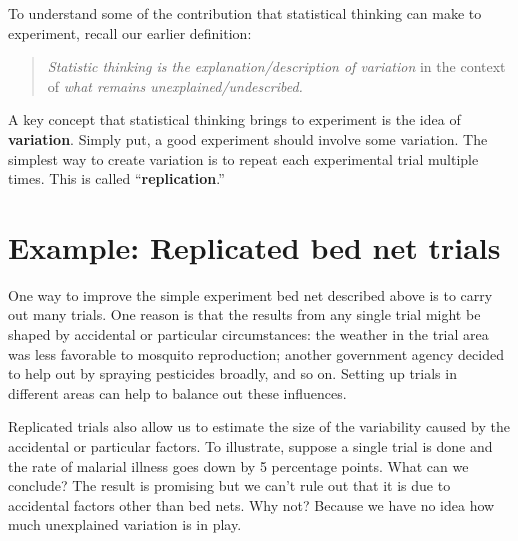\documentclass[
  letterpaper,
  DIV=11,
  numbers=noendperiod,
  oneside]{scrreprt}
\begin{document}
To understand some of the contribution that statistical thinking can
make to experiment, recall our earlier definition:

\begin{quote}
\emph{Statistic thinking is the explanation/description of variation} in
the context of \emph{what remains unexplained/undescribed.}
\end{quote}

A key concept that statistical thinking brings to experiment is the idea
of \textbf{variation}. Simply put, a good experiment should involve some
variation. The simplest way to create variation is to repeat each
experimental trial multiple times. This is called
``\textbf{replication}.''

\hypertarget{example-replicated-bed-net-trials}{%
\section{Example: Replicated bed net
trials}\label{example-replicated-bed-net-trials}}

One way to improve the simple experiment bed net described above is to
carry out many trials. One reason is that the results from any single
trial might be shaped by accidental or particular circumstances: the
weather in the trial area was less favorable to mosquito reproduction;
another government agency decided to help out by spraying pesticides
broadly, and so on. Setting up trials in different areas can help to
balance out these influences.

Replicated trials also allow us to estimate the size of the variability
caused by the accidental or particular factors. To illustrate, suppose a
single trial is done and the rate of malarial illness goes down by 5
percentage points. What can we conclude? The result is promising but we
can't rule out that it is due to accidental factors other than bed nets.
Why not? Because we have no idea how much unexplained variation is in
play.
\end{document}
